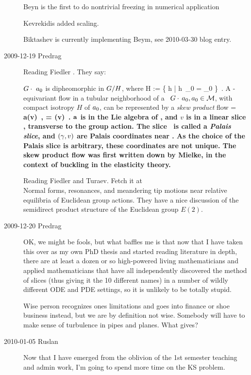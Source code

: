 \begin{description}
Beyn is the first to do nontrivial freezing in numerical
application

Kevrekidis added scaling.

Biktashev is currently implementing Beym, see 2010-03-30
blog entry.

\item[2009-12-19 Predrag]
Reading Fiedler \etal{}. They say:

$G \cdot \ a_0$ is dipheomorphic in $G/H$,
where
\beq
H := \{ h \in \Group | h \,\ssp_0 = \ssp_0 \}
\,.
A \Group-equivariant flow in a tubular neighborhood of a
\reqv\ $G \cdot \,a_0, a_0 \in {\cal M}$,
with compact isotropy $H$ of $a_0$, can be represented
by a {\em skew product} flow
\beq
\dot{\LieEl} = \LieEl \, \bf{a}(v)
	\,,\qquad
{} = \phi(v)
\,.
$\bf{a}$ is in the Lie algebra of \Group, and $v$ is in a linear
slice \pSRed, transverse to the group action. The slice  \pSRed\
is called a {\em Palais slice}, and $(\gamma,v)$ are Palais
coordinates near \reqv. As the choice of the Palais slice is
arbitrary, these coordinates are not unique. The skew product flow
\refeq{FiedlSkPr}  was first
written down by Mielke, in the context of buckling
in the elasticity theory.


Reading Fiedler and Turaev.
Fetch it at
\\
{Normal forms, resonances, and meandering tip motions}
     near relative equilibria of {Euclidean} group actions.
They have a nice discussion of the semidirect product structure of the
Euclidean group $E(2)$.


\item[2009-12-20 Predrag]
	OK, we might be fools, but what baffles me is that now
that I have taken this over as my own PhD thesis and started
reading literature in depth, there are at least a dozen or so
high-powered living mathematicians and applied mathematicians
that have all independently discovered the method of slices
(thus giving it the 10 different names) in a number of wildly
different ODE and PDE settings, so it is unlikely to be
totally stupid.

Wise person recognizes ones limitations and goes into finance
or shoe business instead, but we are by definition not wise.
Somebody will have to make sense of turbulence in pipes and
planes. What gives?

\item[2010-01-05 Ruslan] Now that I have emerged from the
oblivion of the 1st semester teaching and admin work, I'm
going to spend more time on the KS problem.


\end{description}
